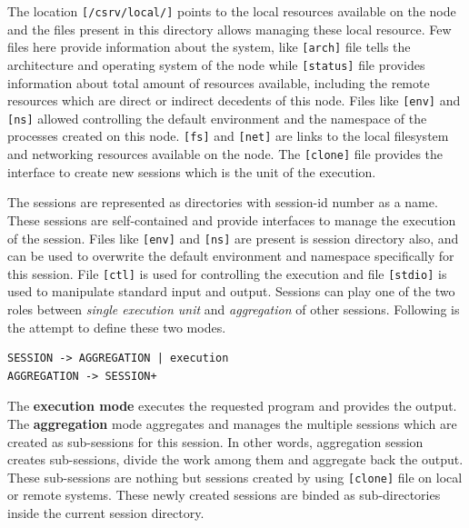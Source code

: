 The location \texttt{[/csrv/local/]} points to the local resources available on
the node and the files present in this directory allows managing these local
resource. Few files here provide information about the system, like
\texttt{[arch]} file tells the architecture and operating system of the node
while \texttt{[status]} file provides information about total amount of
resources available, including the remote resources which are direct or
indirect decedents of this node.  Files like \texttt{[env]} and \texttt{[ns]}
allowed controlling the default environment and the namespace of the processes
created on this node.  \texttt{[fs]} and \texttt{[net]} are links to the local
filesystem and networking resources available on the node.  The
\texttt{[clone]} file provides the interface to create new sessions which is
the unit of the execution.

The sessions are represented as directories with session-id number as a name. 
These sessions are self-contained and provide interfaces to manage the
execution of the session.  Files like \texttt{[env]} and \texttt{[ns]} are
present is session directory also, and can be used to overwrite the default
environment and namespace specifically for this session.  File \texttt{[ctl]} is
used for controlling the execution and file \texttt{[stdio]} is used to
manipulate standard input and output.  Sessions can play one of the two roles
between \textit{single execution unit} and \textit{aggregation} of other
sessions. Following is the attempt to define these two modes.
\begin{verbatim}
SESSION -> AGGREGATION | execution
AGGREGATION -> SESSION+
\end{verbatim}
The \textbf{execution mode} executes the requested program and provides the
output.  The \textbf{aggregation} mode aggregates and manages the multiple
sessions which are created as sub-sessions for this session.  In other words,
aggregation session creates sub-sessions, divide the work among them and
aggregate back the output.  These sub-sessions are nothing but sessions created
by using \texttt{[clone]} file on local or remote systems.  These newly created
sessions are binded as sub-directories inside the current session directory.

